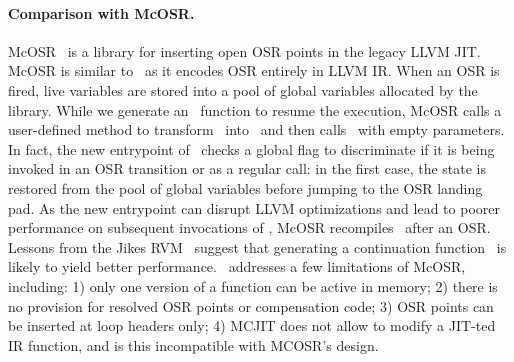 \paragraph{Comparison with McOSR.}
McOSR~\cite{lameed2013modular} is a library for inserting open OSR points in the legacy LLVM JIT. McOSR is similar to \osrkit\ as it encodes OSR entirely in LLVM IR. When an OSR is fired, live variables are stored into a pool of global variables allocated by the library. While we generate an \fosrto\ function to resume the execution, McOSR calls a user-defined method to transform \fbase\ into \fvariant\ and then calls \fbase\ with empty parameters. In fact, the new entrypoint of \fbase\ checks a global flag to discriminate if it is being invoked in an OSR transition or as a regular call: in the first case, the state is restored from the pool of global variables before jumping to the OSR landing pad. As the new entrypoint can disrupt LLVM optimizations and lead to poorer performance on subsequent invocations of \fbase, McOSR recompiles \fbase\ after an OSR. Lessons from the Jikes RVM~\cite{fink2003design} suggest that generating a continuation function \fosrto\ is likely to yield better performance. \osrkit\ addresses a few limitations of McOSR, including: 1) only one version of a function can be active in memory; 2) there is no provision for resolved OSR points or compensation code; 3) OSR points can be inserted at loop headers only; 4) MCJIT does not allow to modify a JIT-ted IR function, and is this incompatible with MCOSR's design.